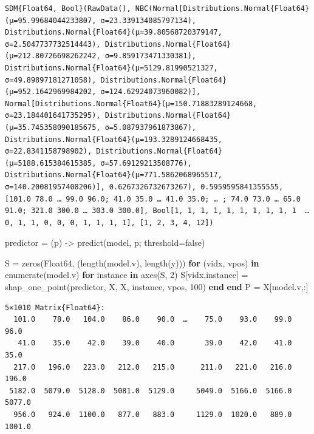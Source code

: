 \documentclass[
  letterpaper,
]{scrbook}
\newenvironment{Shaded}{\begin{snugshade}}{\end{snugshade}}
\newcommand{\ConstantTok}[1]{\textcolor[rgb]{0.56,0.35,0.01}{#1}}
\newcommand{\ControlFlowTok}[1]{\textcolor[rgb]{0.00,0.23,0.31}{\textbf{#1}}}
\newcommand{\DataTypeTok}[1]{\textcolor[rgb]{0.68,0.00,0.00}{#1}}
\newcommand{\FloatTok}[1]{\textcolor[rgb]{0.68,0.00,0.00}{#1}}
\newcommand{\FunctionTok}[1]{\textcolor[rgb]{0.28,0.35,0.67}{#1}}
\newcommand{\KeywordTok}[1]{\textcolor[rgb]{0.00,0.23,0.31}{\textbf{#1}}}
\newcommand{\NormalTok}[1]{\textcolor[rgb]{0.00,0.23,0.31}{#1}}
\newcommand{\OperatorTok}[1]{\textcolor[rgb]{0.37,0.37,0.37}{#1}}
\begin{document}
\begin{verbatim}
SDM{Float64, Bool}(RawData(), NBC(Normal[Distributions.Normal{Float64}(μ=95.99684044233807, σ=23.339134085797134), Distributions.Normal{Float64}(μ=39.80568720379147, σ=2.5047737732514443), Distributions.Normal{Float64}(μ=212.80726698262242, σ=9.859173471330381), Distributions.Normal{Float64}(μ=5129.81990521327, σ=49.89897181271058), Distributions.Normal{Float64}(μ=952.1642969984202, σ=124.62924073960082)], Normal[Distributions.Normal{Float64}(μ=150.71883289124668, σ=23.184401641735295), Distributions.Normal{Float64}(μ=35.745358090185675, σ=5.087937961873867), Distributions.Normal{Float64}(μ=193.3289124668435, σ=22.8341158798902), Distributions.Normal{Float64}(μ=5188.615384615385, σ=57.69129213508776), Distributions.Normal{Float64}(μ=771.5862068965517, σ=140.20081957408206)], 0.6267326732673267), 0.5959595841355555, [101.0 78.0 … 99.0 96.0; 41.0 35.0 … 41.0 35.0; … ; 74.0 73.0 … 65.0 91.0; 321.0 300.0 … 303.0 300.0], Bool[1, 1, 1, 1, 1, 1, 1, 1, 1, 1  …  0, 1, 1, 0, 0, 0, 1, 1, 1, 1], [1, 2, 3, 4, 12])
\end{verbatim}

\begin{Shaded}
\begin{Highlighting}[]
\NormalTok{predictor }\OperatorTok{=}\NormalTok{ (p) }\OperatorTok{{-}\textgreater{}} \FunctionTok{predict}\NormalTok{(model, p; threshold}\OperatorTok{=}\ConstantTok{false}\NormalTok{)}

\NormalTok{S }\OperatorTok{=} \FunctionTok{zeros}\NormalTok{(}\DataTypeTok{Float64}\NormalTok{, (}\FunctionTok{length}\NormalTok{(model.v), }\FunctionTok{length}\NormalTok{(y)))}
\ControlFlowTok{for}\NormalTok{ (vidx, vpos) }\KeywordTok{in} \FunctionTok{enumerate}\NormalTok{(model.v)}
    \ControlFlowTok{for}\NormalTok{ instance }\KeywordTok{in} \FunctionTok{axes}\NormalTok{(S, }\FloatTok{2}\NormalTok{)}
\NormalTok{        S[vidx,instance] }\OperatorTok{=} \FunctionTok{shap\_one\_point}\NormalTok{(predictor, X, X, instance, vpos, }\FloatTok{100}\NormalTok{)}
    \ControlFlowTok{end}
\ControlFlowTok{end}
\NormalTok{P }\OperatorTok{=}\NormalTok{ X[model.v,}\OperatorTok{:}\NormalTok{]}
\end{Highlighting}
\end{Shaded}

\begin{verbatim}
5×1010 Matrix{Float64}:
  101.0    78.0   104.0    86.0    90.0  …    75.0    93.0    99.0    96.0
   41.0    35.0    42.0    39.0    40.0       39.0    42.0    41.0    35.0
  217.0   196.0   223.0   212.0   215.0      211.0   221.0   216.0   196.0
 5182.0  5079.0  5128.0  5081.0  5129.0     5049.0  5166.0  5166.0  5077.0
  956.0   924.0  1100.0   877.0   883.0     1129.0  1020.0   889.0  1001.0
\end{verbatim}
\end{document}
